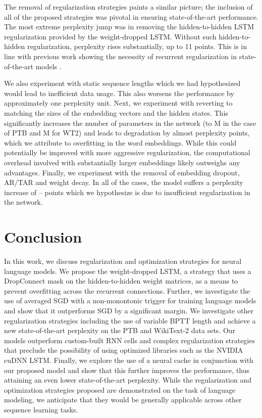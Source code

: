 \documentclass{article}
\begin{document}
The removal of regularization strategies paints a similar picture; the inclusion of all of the proposed strategies was pivotal in ensuring state-of-the-art performance.
The most extreme perplexity jump was in removing the hidden-to-hidden LSTM regularization provided by the weight-dropped LSTM.
Without such hidden-to-hidden regularization, perplexity rises substantially, up to 11 points.
This is in line with previous work showing the necessity of recurrent regularization in state-of-the-art models \citep{Gal2016ATG,Inan2016}.

We also experiment with static sequence lengths which we had hypothesized would lead to inefficient data usage.
This also worsens the performance by approximately one perplexity unit. Next, we experiment with reverting to matching the sizes of the embedding vectors and the hidden states.
This significantly increases the number of parameters in the network (to M in the case of PTB and M for WT2) and leads to degradation by almost  perplexity points, which we attribute to overfitting in the word embeddings.
While this could potentially be improved with more aggressive regularization, the computational overhead involved with substantially larger embeddings likely outweighs any advantages.
Finally, we experiment with the removal of embedding dropout, AR/TAR and weight decay. In all of the cases, the model suffers a perplexity increase of -- points which we hypothesize is due to insufficient regularization in the network.

\section{Conclusion}

In this work, we discuss regularization and optimization strategies for neural language models. We propose the weight-dropped LSTM, a strategy that uses a DropConnect mask on the hidden-to-hidden weight matrices, as a means to prevent overfitting across the recurrent connections. Further, we investigate the use of averaged SGD with a non-monontonic trigger for training language models and show that it outperforms SGD by a significant margin. We investigate other regularization strategies including the use of variable BPTT length and achieve a new state-of-the-art perplexity on the PTB and WikiText-2 data sets. Our models outperform custom-built RNN cells and complex regularization strategies that preclude the possibility of using optimized libraries such as the NVIDIA cuDNN LSTM. Finally, we explore the use of a neural cache in conjunction with our proposed model and show that this further improves the performance, thus attaining an even lower state-of-the-art perplexity.
While the regularization and optimization strategies proposed are demonstrated on the task of language modeling, we anticipate that they would be generally applicable across other sequence learning tasks.











\end{document}

